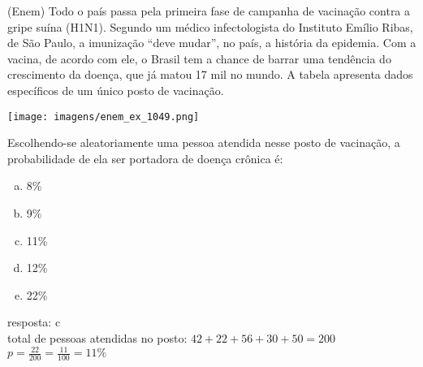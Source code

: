 \begin{ex}
   (Enem) Todo o país passa pela primeira fase de campanha de vacinação contra a gripe suína (H1N1). Segundo um médico infectologista do Instituto Emílio Ribas, de São Paulo, a imunização “deve mudar”, no país, a história da epidemia. Com a vacina, de acordo com ele, o Brasil tem a chance de barrar uma tendência do crescimento da doença, que já matou 17 mil no mundo. A tabela apresenta dados específicos de um único posto de vacinação.
     \begin{center}
         \texttt{[image: imagens/enem\_ex\_1049.png]}
     \end{center}
  Escolhendo-se aleatoriamente uma pessoa atendida nesse posto de vacinação, a probabilidade de ela ser portadora de doença crônica é:
    \begin{enumerate}  [(a)]
        \item 8\%
        \item 9\%
        \item 11\%
        \item 12\%
        \item 22\%
    \end{enumerate}
      \begin{sol}
      resposta: c \\
      total de pessoas atendidas no posto: $42+22+56+30+50=200$\\
      $p=\frac{22}{200}=\frac{11}{100}=11\%$
      \end{sol}
 \end{ex}